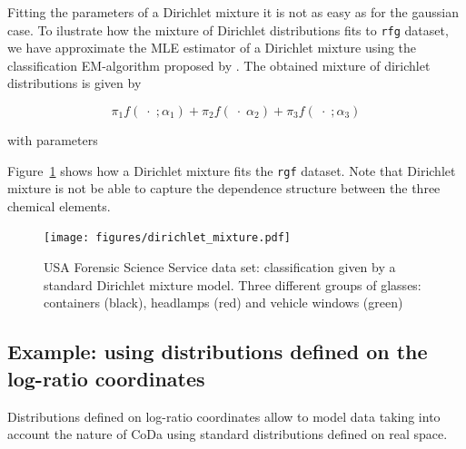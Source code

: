 \documentclass[10pt, a4paper]{article}
\begin{document}
Fitting the parameters of a Dirichlet mixture it is not as easy as for the gaussian case. To ilustrate how the mixture of Dirichlet distributions fits to \texttt{rfg} dataset, we have approximate the MLE estimator of a Dirichlet mixture using the classification EM-algorithm proposed by \cite{celeux1992classification}. The obtained mixture of dirichlet distributions is given by

\[
\pi_1 f(\;\cdot\; ; \alpha_1) + \pi_2 f(\;\cdot\; \alpha_2) + \pi_3 f(\;\cdot\; ; \alpha_3)
\]

with parameters

{\small  }




Figure~\ref{fig06fittingdirichlet} shows how a Dirichlet mixture fits the \texttt{rgf} dataset. Note that Dirichlet mixture is not be able to capture the dependence structure between the three chemical elements. 

\begin{figure}[htbp]
\centering
\texttt{[image: figures/dirichlet\_mixture.pdf]}
\caption{USA Forensic Science Service data set: classification given by a standard Dirichlet mixture model. Three different groups of glasses: containers (black), headlamps (red) and vehicle windows (green)}
\label{fig06fittingdirichlet}
\end{figure}

\subsection*{Example: using distributions defined on the log-ratio coordinates}

Distributions defined on log-ratio coordinates allow to model data taking into account the nature of CoDa using standard distributions defined on real space.
\end{document}
